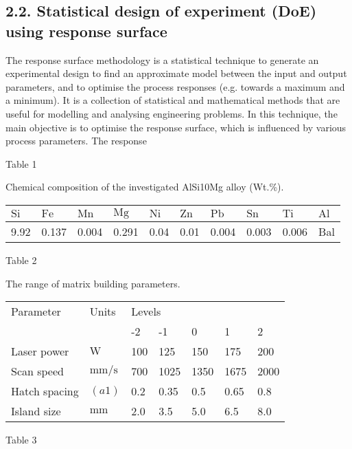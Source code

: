\documentclass[10pt]{article}
\begin{document}
\subsection*{2.2. Statistical design of experiment (DoE) using response surface}
The response surface methodology is a statistical technique to generate an experimental design to find an approximate model between the input and output parameters, and to optimise the process responses (e.g. towards a maximum and a minimum). It is a collection of statistical and mathematical methods that are useful for modelling and analysing engineering problems. In this technique, the main objective is to optimise the response surface, which is influenced by various process parameters. The response

Table 1

Chemical composition of the investigated AlSi10Mg alloy (Wt.\%).

\begin{center}
\begin{tabular}{llllllllll}
\hline
$\mathrm{Si}$ & $\mathrm{Fe}$ & $\mathrm{Mn}$ & $\mathrm{Mg}$ & $\mathrm{Ni}$ & $\mathrm{Zn}$ & $\mathrm{Pb}$ & $\mathrm{Sn}$ & $\mathrm{Ti}$ & $\mathrm{Al}$ \\
\hline
9.92 & 0.137 & 0.004 & 0.291 & 0.04 & 0.01 & 0.004 & 0.003 & 0.006 & Bal \\
\hline
\end{tabular}
\end{center}

Table 2

The range of matrix building parameters.

\begin{center}
\begin{tabular}{lllllll}
\hline
Parameter & Units & \multicolumn{2}{l}{Levels} &  &  &  \\
\cline { 3 - 6 }
 &  & -2 & -1 & 0 & 1 & 2 \\
\hline
Laser power & $\mathrm{W}$ & 100 & 125 & 150 & 175 & 200 \\
Scan speed & $\mathrm{mm} / \mathrm{s}$ & 700 & 1025 & 1350 & 1675 & 2000 \\
Hatch spacing & $(a 1)$ & 0.2 & 0.35 & 0.5 & 0.65 & 0.8 \\
Island size & $\mathrm{mm}$ & 2.0 & 3.5 & 5.0 & 6.5 & 8.0 \\
\hline
\end{tabular}
\end{center}

Table 3
\end{document}
